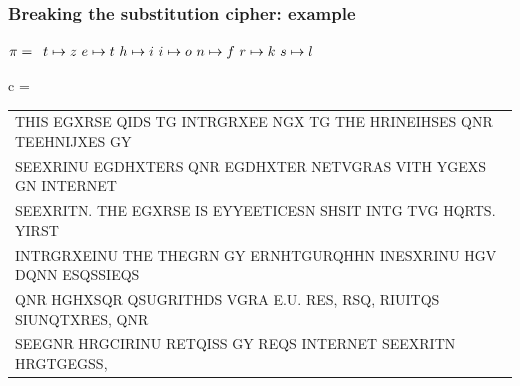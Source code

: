 \documentclass[aspectratio=169, lualatex, handout, 10pt,dvipsnames,svgnames]{beamer} %
\def\enbleu#1{\textcolor{bleu}{#1}}
\def\enrouge#1{\textcolor{rouge}{#1}}
\begin{document}
\begin{frame}
  \frametitle{Breaking the substitution cipher: example}
  
    \enrouge{
    \tiny{$\pi=
      \begin{array}[t]{l}
      t\mapsto z\ e\mapsto t\ h\mapsto i\ i\mapsto o\ n\mapsto f\ r\mapsto k\ s\mapsto l\ 
      \end{array}
      $}}
  \vspace{0.25cm}

  \color{vert}
  \tiny{c =
    \begin{tabular}[t]{l}
      \enbleu{T}\enbleu{H}\enbleu{I}\enbleu{S} EGX\enbleu{R}\enbleu{S}\enbleu{E} Q\enbleu{I}D\enbleu{S} \enbleu{T}G \enbleu{I}\enbleu{N}\enbleu{T}\enbleu{R}GRXE\enbleu{E} NGX \enbleu{T}G \enbleu{T}\enbleu{H}\enbleu{E} H\enbleu{R}\enbleu{I}\enbleu{N}E\enbleu{I}HS\enbleu{E}\enbleu{S} Q\enbleu{N}R \enbleu{T}\enbleu{E}E\enbleu{H}\enbleu{N}\enbleu{I}JX\enbleu{E}\enbleu{S} GY \\
      \enbleu{S}\enbleu{E}EX\enbleu{R}\enbleu{I}\enbleu{N}U EGDHX\enbleu{T}\enbleu{E}\enbleu{R}\enbleu{S} Q\enbleu{N}R EGDHX\enbleu{T}\enbleu{E}\enbleu{R} \enbleu{N}\enbleu{E}\enbleu{T}VG\enbleu{R}A\enbleu{S} V\enbleu{I}\enbleu{T}\enbleu{H} YGEX\enbleu{S} G\enbleu{N} \enbleu{I}\enbleu{N}\enbleu{T}\enbleu{E}\enbleu{R}\enbleu{N}\enbleu{E}\enbleu{T} \\
      \enbleu{S}\enbleu{E}EX\enbleu{R}\enbleu{I}\enbleu{T}N. \enbleu{T}\enbleu{H}\enbleu{E} EGX\enbleu{R}\enbleu{S}\enbleu{E} \enbleu{I}\enbleu{S} \enbleu{E}YY\enbleu{E}E\enbleu{T}\enbleu{I}C\enbleu{E}SN \enbleu{S}HS\enbleu{I}\enbleu{T} \enbleu{I}\enbleu{N}\enbleu{T}G \enbleu{T}VG HQ\enbleu{R}\enbleu{T}\enbleu{S}. Y\enbleu{I}\enbleu{R}\enbleu{S}\enbleu{T} \\
      \enbleu{I}\enbleu{N}\enbleu{T}\enbleu{R}GRXE\enbleu{I}\enbleu{N}U \enbleu{T}\enbleu{H}\enbleu{E} \enbleu{T}\enbleu{H}\enbleu{E}G\enbleu{R}N GY E\enbleu{R}NH\enbleu{T}GU\enbleu{R}QH\enbleu{H}N \enbleu{I}\enbleu{N}ESXR\enbleu{I}\enbleu{N}U \enbleu{H}GV DQ\enbleu{N}N ESQ\enbleu{S}\enbleu{S}\enbleu{I}EQS \\
      Q\enbleu{N}R HGHXSQ\enbleu{R} QSUG\enbleu{R}\enbleu{I}\enbleu{T}\enbleu{H}D\enbleu{S} VG\enbleu{R}A \enbleu{E}.U. R\enbleu{E}\enbleu{S}, \enbleu{R}\enbleu{S}Q, R\enbleu{I}U\enbleu{I}\enbleu{T}QS \enbleu{S}\enbleu{I}U\enbleu{N}Q\enbleu{T}X\enbleu{R}\enbleu{E}\enbleu{S}, Q\enbleu{N}R \\
      \enbleu{S}\enbleu{E}EG\enbleu{N}R H\enbleu{R}GC\enbleu{I}R\enbleu{I}\enbleu{N}U R\enbleu{E}\enbleu{T}Q\enbleu{I}S\enbleu{S} GY \enbleu{R}\enbleu{E}QS \enbleu{I}\enbleu{N}\enbleu{T}\enbleu{E}\enbleu{R}\enbleu{N}\enbleu{E}\enbleu{T} \enbleu{S}\enbleu{E}EX\enbleu{R}\enbleu{I}\enbleu{T}N H\enbleu{R}G\enbleu{T}GEGS\enbleu{S}, \\

\end{tabular}}
\end{frame}
\end{document}
